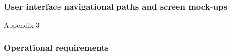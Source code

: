 \documentclass[12pt]{article}
\begin{document}
{%


 \subsubsection{User interface navigational paths and screen mock-ups}
 Appendix 3


\subsubsection{Operational requirements}

}
\end{document}
